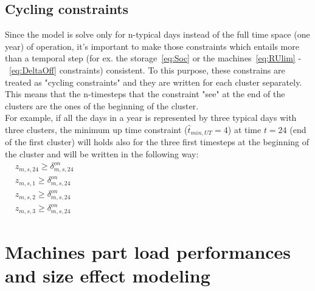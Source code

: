 \documentclass{article}
\begin{document}
{\subsection{Cycling constraints}
Since the model is solve only for n-typical days instead of the full time space (one year) of operation, it's important to make those constraints which entails more than a temporal step (for ex. the storage~\eqref{eq:Soc} or the machines~\eqref{eq:RUlim} -~\eqref{eq:DeltaOff} constraints) consistent. To this purpose, these constrains are treated as "cycling constraints" and they are written for each cluster separately. This means that the n-timesteps that the constraint "see" at the end of the clusters are the ones of the beginning of the cluster. \\
For example, if all the days in a year is represented by three typical days with three clusters, the minimum up time constraint ($\hat{t}_{min,UT} = 4$) at time $t=24$ (end of the first cluster) will holds also for the three first timesteps at the beginning of the cluster and will be written in the following way: 
	\begin{align}
	& z_{m,s,24} \geq \delta_{m,s,24}^{on} \hspace{12cm} \\
	& z_{m,s,1} \geq \delta_{m,s,24}^{on} \\
	& z_{m,s,2} \geq \delta_{m,s,24}^{on} \\
	& z_{m,s,3} \geq \delta_{m,s,24}^{on} 
	\end{align}


\section{Machines part load performances and size effect modeling}
}
\end{document}
